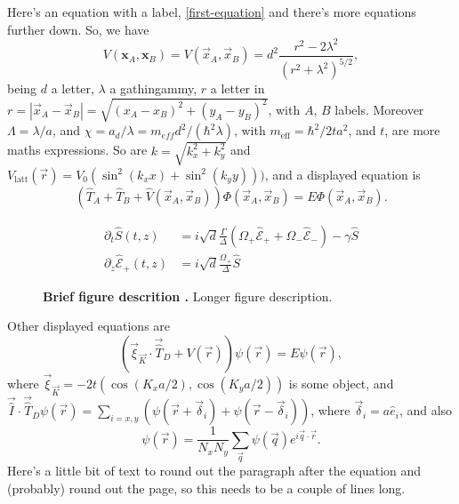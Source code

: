 \documentclass[twoside,british,a4paper,twocolumn]{article}
\newcommand{\figurecaption}[2]{\caption[#1]{\textbf{#1.} #2}}
\begin{document}
\lipsum[4]


Here's an equation with a label, \eqref{first-equation} and there's more equations further down. So, we have
\begin{equation}
V(\mathbf{x}_A,\mathbf{x}_B)=V(\vec{x}_A,\vec{x}_B)=d^2\frac{r^2-2\lambda^2}{(r^2+\lambda^2)^{5/2}},
\label{first-equation}
\end{equation}
being $d$ a letter, $\lambda$ a gathingammy, $r$ a letter in $r=|\vec{x}_A-\vec{x}_B|=\sqrt{(x_A-x_B)^2+(y_A-y_B)^2}$, with  $A$, $B$  labels. Moreover $\Lambda=\lambda/a$, and  $\chi = a_{d}/\lambda = m_{eff}d^2/(\hbar^2 \lambda)$, with $m_\mathrm{eff}=\hbar^2/2ta^2$, and $t$, are more maths expressions. So are $k=\sqrt{k_x^2+k_y^2}$ and $V_\mathrm{latt}(\vec r)= V_0\left(\sin^2(k_x x)+ \sin^2(k_y y)\right))$, and a displayed equation is 
\begin{equation}
\left(\hat{T}_A+\hat{T}_B+{\hat V}(\vec{x}_A,\vec{x}_B)\right)\Phi(\vec{x}_A,\vec{x}_B)=E\Phi(\vec{x}_A,\vec{x}_B).
\end{equation}

\lipsum[1]


\begin{align}
\partial_t \hat S(t,z) & = i\sqrt{d} \frac{\Gamma}{\Delta}\left( \Omega_+ \hat{\mathcal E}_+ + \Omega_- \hat{\mathcal E}_- \right) - \gamma \hat S \\
\partial_z \hat{\mathcal E}_+ (t,z) & = i \sqrt{d} \frac{\Omega_+}{\Delta} \hat{S}
\end{align}



\begin{figure}[b]
\centering
  \centering
\label{fig-knot-table}
\figurecaption{%
Brief figure descrition%
}{%
Longer figure description.
}
\end{figure}



\lipsum[1-3]

Other displayed equations are
\begin{equation}
(\vec{\xi}_{\vec{K}}\cdot\vec{\hat{T}}_D+V(\vec{r}))\psi(\vec{r})=E\psi(\vec{r}),
\end{equation}
where $\vec{\xi }_{\vec{K}}=-2t(\cos(K_x a/2),\cos(K_y a/2))$ is some object, and  $\vec{\hat{I}}\cdot\vec{\hat{T}}_D\psi(\vec{r})=\sum_{i=x,y}\left(\psi(\vec{r}+\vec{\delta}_i)+\psi(\vec{r}-\vec{\delta}_i)\right)$, where $\vec{\delta}_i=a\hat{e}_{i}$, and also
\begin{equation}
\psi(\vec{r})=\frac{1}{N_x N_y}\sum_{\vec{q}}\psi(\vec{q})e^{i\vec{q}\cdot\vec{r}}.
\end{equation}
Here's a little bit of text to round out the paragraph after the equation and (probably) round out the page, so this needs to be a couple of lines long.
\end{document}
